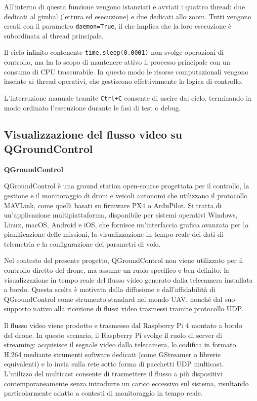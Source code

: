 All’interno di questa funzione vengono istanziati e avviati i quattro thread:
due dedicati al gimbal (lettura ed esecuzione) e due dedicati allo zoom.
Tutti vengono creati con il parametro \texttt{daemon=True},
il che implica che la loro esecuzione è subordinata al thread principale.

Il ciclo infinito contenente \texttt{time.sleep(0.0001)} non svolge operazioni di controllo,
ma ha lo scopo di mantenere attivo il processo principale
con un consumo di CPU trascurabile.
In questo modo le risorse computazionali vengono lasciate ai thread operativi,
che gestiscono effettivamente la logica di controllo.

L’interruzione manuale tramite \texttt{Ctrl+C} consente di uscire dal ciclo,
terminando in modo ordinato l’esecuzione durante le fasi di test o debug.\bigskip
\subsection{Visualizzazione del flusso video su QGroundControl}
\bigskip

\bigskip
\noindent \textbf{QGroundControl}
\bigskip

QGroundControl \cite{qgc} è una ground station open-source progettata per il controllo, la gestione e il monitoraggio di droni e veicoli autonomi che utilizzano il protocollo MAVLink, come quelli basati su firmware PX4 o ArduPilot.
Si tratta di un’applicazione multipiattaforma, disponibile per sistemi operativi Windows, Linux, macOS, Android e iOS, che fornisce un’interfaccia grafica avanzata per la pianificazione delle missioni, la visualizzazione in tempo reale dei dati di telemetria e la configurazione dei parametri di volo.

Nel contesto del presente progetto, QGroundControl non viene utilizzato per il controllo diretto del drone, ma assume un ruolo specifico e ben definito: la visualizzazione in tempo reale del flusso video generato dalla telecamera installata a bordo.
Questa scelta è motivata dalla diffusione e dall’affidabilità di QGroundControl come strumento standard nel mondo UAV, nonché dal suo supporto nativo alla ricezione di flussi video trasmessi tramite protocollo UDP.

Il flusso video viene prodotto e trasmesso dal Raspberry Pi 4 montato a bordo del drone.
In questo scenario, il Raspberry Pi svolge il ruolo di server di streaming: acquisisce il segnale video dalla telecamera, lo codifica in formato H.264 mediante strumenti software dedicati (come GStreamer o librerie equivalenti) e lo invia sulla rete sotto forma di pacchetti UDP multicast.
L’utilizzo del multicast consente di trasmettere il flusso a più dispositivi contemporaneamente senza introdurre un carico eccessivo sul sistema, risultando particolarmente adatto a contesti di monitoraggio in tempo reale.


